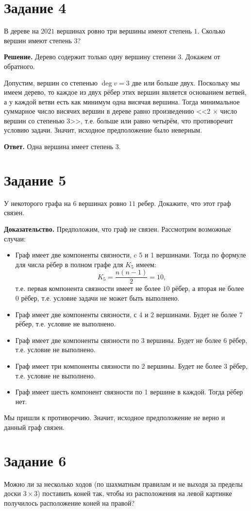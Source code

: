 \documentclass[a4paper,12pt]{article}
\begin{document}
\section*{Задание 4}
В дереве на $2021$ вершинах ровно три вершины имеют степень $1$.
Сколько вершин имеют степень $3$? \par
{\bf Решение.} Дерево содержит только одну вершину степени $3$. Докажем от обратного.\par Допустим, вершин со степенью $\deg v = 3$ две или больше двух. Поскольку мы имеем дерево, то каждое из двух рёбер этих вершин является основанием ветвей, а у каждой ветви есть как минимум одна висячая вершина. Тогда минимальное суммарное число висячих вершин в дереве равно произведению <<2 $\times$ число вершин со степенью 3>>, т.е. больше или равно четырём, что противоречит условию задачи. Значит, исходное предположение было неверным. \par
{\bf Ответ.} Одна вершина имеет степень $3$.

\section*{Задание 5}
У некоторого графа на $6$ вершинах ровно $11$ ребер. Докажите, что этот граф связен. \par
{\bf Доказательство.} Предположим, что граф не связен. Рассмотрим возможные случаи:
\begin{itemize}
\item Граф имеет две компоненты связности, c 5 и 1 вершинами. Тогда по формуле для числа рёбер в полном графе для $K_5$ имеем:
$$K_5=\frac{n(n-1)}{2}=10,$$
т.е. первая компонента связности имеет не более $10$ рёбер, а вторая не более $0$ рёбер, т.е. условие задачи не может быть выполнено.
\item Граф имеет две компоненты связности, с 4 и 2 вершинами. Будет не более $7$ рёбер, т.е. условие не выполнено.
\item Граф имеет две компоненты связности по 3 вершины. Будет не более $6$ рёбер, т.е. условие не выполнено.
\item Граф имеет три компоненты связности по 2 вершины. Будет не более $3$ рёбер, т.е. условие не выполнено.
\item Граф имеет шесть компонент связности по 1 вершине в каждой. Тогда рёбер нет.
\end{itemize}
Мы пришли к противоречию. Значит, исходное предположение не верно и данный граф связен.

\section*{Задание 6}
Можно ли за несколько ходов (по шахматным правилам и не выходя за пределы доски $3\times 3$) поставить коней так, чтобы из расположения на левой картинке получилось расположение коней на правой?
\end{document}

